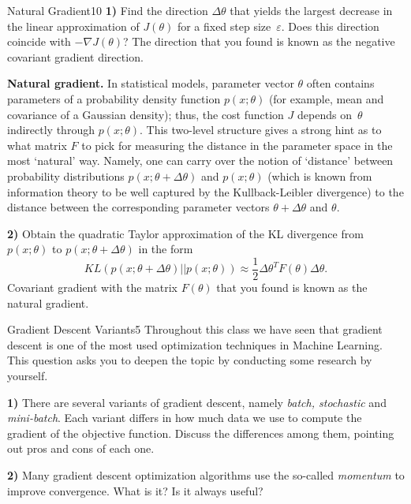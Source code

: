 \begin{questions}
\begin{question}[bonus]{Natural Gradient}{10}
\textbf{1)} Find the direction $\Delta \theta$ that yields
the largest decrease in the linear approximation of $J(\theta)$
for a fixed step size~$\varepsilon$.
Does this direction coincide with $-\nabla J(\theta)$?
The direction that you found is known as the
negative covariant gradient direction.

\textbf{Natural gradient.}
In statistical models, parameter vector $\theta$ often
contains parameters of a probability density function $p(x; \theta)$
(for example, mean and covariance of a Gaussian density);
thus, the cost function $J$ depends on~$\theta$ indirectly
through $p(x; \theta)$.
This two-level structure gives a strong hint as to what matrix $F$
to pick for measuring the distance in the parameter space
in the most `natural' way.
Namely, one can carry over the notion of `distance' between
probability distributions $p(x; \theta + \Delta \theta)$
and $p(x; \theta)$ (which is known from information theory
to be well captured by the Kullback-Leibler divergence)
to the distance between the corresponding parameter vectors
$\theta + \Delta \theta$ and $\theta$.

\textbf{2)} Obtain the quadratic Taylor approximation
of the KL divergence
from $p(x; \theta)$ to $p(x; \theta + \Delta \theta)$ in the form
\begin{equation*}
  KL(p(x; \theta + \Delta \theta) || p(x; \theta)) \approx
  \frac{1}{2}\Delta \theta^T F(\theta) \Delta \theta.
\end{equation*}
Covariant gradient with the matrix $F(\theta)$ that you found
is known as the natural gradient.

\begin{answer}\end{answer}

\end{question}


\begin{question}[bonus]{Gradient Descent Variants}{5}
Throughout this class we have seen that gradient descent is one of the most used optimization techniques in Machine Learning. This question asks you to deepen the topic by conducting some research by yourself.

\textbf{1)} There are several variants of gradient descent, namely \emph{batch, stochastic} and \emph{mini-batch}. Each variant differs in how much data we use to compute the gradient of the objective function. 
Discuss the differences among them, pointing out pros and cons of each one.

\textbf{2)} Many gradient descent optimization algorithms use the so-called \emph{momentum} to improve convergence. What is it? Is it always useful?

\begin{answer}\end{answer}

\end{question}


\end{questions}
